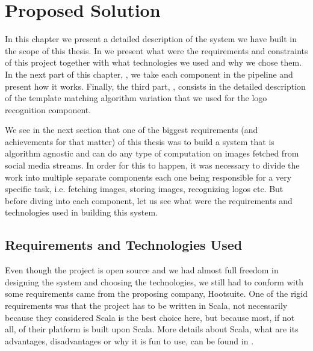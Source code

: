 \chapter{Proposed Solution}
\label{chapter:proposed-sol}

In this chapter we present a detailed description of the system we have built
in the scope of this thesis. In  we
present what were the requirements and constraints of this project together
with what technologies we used and why we chose them. In the next part of this
chapter, , we take each component in the
pipeline and present how it works. Finally, the third part,
, consists in the detailed description of
the template matching algorithm variation that we used for the logo
recognition component.

We see in the next section that one of the biggest requirements
(and achievements for that matter) of this thesis was to build a system that
is algorithm agnostic and can do any type of computation on images fetched
from social media streams. In order for this to happen, it was necessary to
divide the work into multiple separate components each one being responsible
for a very specific task, i.e. fetching images, storing images, recognizing
logos etc. But before diving into each component, let us see what were the
requirements and technologies used in building this system.

\section{Requirements and Technologies Used}
\label{sec:reqs-tech}

Even though the project is open source and we had almost full freedom in
designing the system and choosing the technologies, we still had to conform
with some requirements came from the proposing company, Hootsuite. One of the
rigid requirements was that the project has to be written in Scala, not
necessarily because they considered Scala is the best choice here, but because
most, if not all, of their platform is built upon Scala. More details about
Scala, what are its advantages, disadvantages or why it is fun to use, can be
found in .

